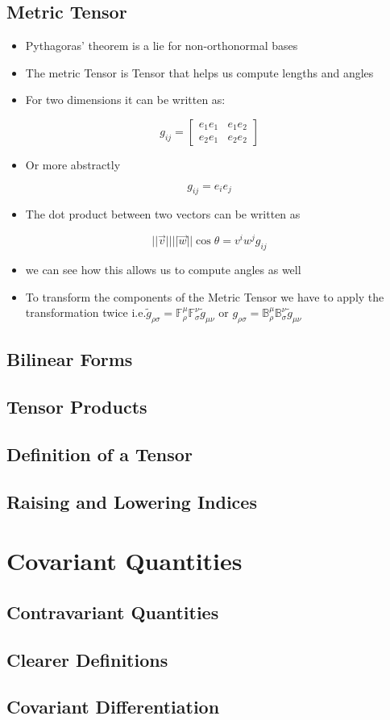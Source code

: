 \subsection{Metric Tensor}
\begin{itemize}
	\item Pythagoras' theorem is a lie for non-orthonormal bases
	\item The metric Tensor is Tensor that helps us compute lengths and angles
	\item For two dimensions it can be written as:
\end{itemize}
$$\textit{g}_{ij} = \begin{bmatrix}
	e_{1}e_{1} & e_{1}e_{2} \\
	e_{2}e_{1} & e_{2}e_{2} 
\end{bmatrix}$$
\begin{itemize}
	\item Or more abstractly
\end{itemize}
$$\textit{g}_{ij} = e_{i}e_{j}$$
\begin{itemize}
	\item The dot product between two vectors can be written as
\end{itemize}
$$||\vec{v}|| ||\vec{w}||\cos{\theta} = v^{i}w^{j}\textit{g}_{ij}$$
\begin{itemize}
	\item we can see how this allows us to compute angles as well
	\item To transform the components of the Metric Tensor we have to apply the transformation twice i.e.$\tilde{g}_{\rho \sigma} = \mathbb{F}^{\mu}_{\rho} \mathbb{F}^{\nu}_{\sigma}\tilde{g}_{\mu \nu}$ or $g_{\rho \sigma} = \mathbb{B}^{\mu}_{\rho} \mathbb{B}^{\nu}_{\sigma}\tilde{g}_{\mu \nu}$
\end{itemize}

\subsection{Bilinear Forms}

\subsection{Tensor Products}

\subsection{Definition of a Tensor}

\subsection{Raising and Lowering Indices}
\section{Covariant Quantities}
\subsection{Contravariant Quantities}
\subsection{Clearer Definitions}
\subsection{Covariant Differentiation}